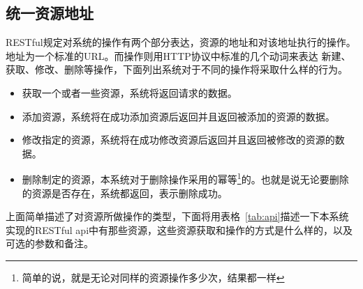 \subsection{统一资源地址}
\label{sec:researchurl}
RESTful规定对系统的操作有两个部分表达，资源的地址和对该地址执行的操作。地址为一个标准的URL。而操作则用HTTP协议中标准的几个动词来表达 新建、获取、修改、删除等操作，下面列出系统对于不同的操作将采取什么样的行为。
\begin{itemize}
\item {} 获取一个或者一些资源，系统将返回请求的数据。
\item {} 添加资源，系统将在成功添加资源后返回并且返回被添加的资源的数据。
\item {} 修改指定的资源，系统将在成功修改资源后返回并且返回被修改的资源的数据。
\item {} 删除制定的资源，本系统对于删除操作采用的幂等\footnote{简单的说，就是无论对同样的资源操作多少次，结果都一样}的。也就是说无论要删除的资源是否存在，系统都返回，表示删除成功。
\end{itemize}


上面简单描述了对资源所做操作的类型，下面将用表格~\ref{tab:api}描述一下本系统实现的RESTful api中有那些资源，这些资源获取和操作的方式是什么样的，以及可选的参数和备注。

